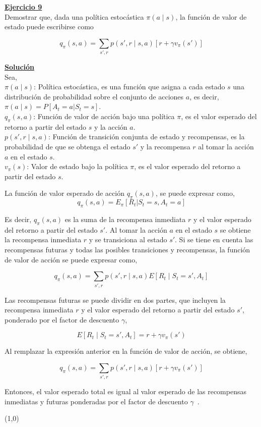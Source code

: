 \indent\underline{\textbf{Ejercicio 9}}\\
Demostrar que, dada una política estocástica $\pi (a \mid s)$, la función de valor de estado puede escribirse como

\[
    q_{\pi}(s,a) = \sum_{s',r} p(s', r \mid s, a) [r + \gamma v_{\pi}(s')]
\]

\indent\underline{\textbf{Solución}}\\
Sea,\\
$\pi(a \mid s)$: Política estocástica, es una función que asigna a cada estado $s$ una distribución de probabilidad sobre el conjunto de acciones $a$, es decir, $\pi(a \mid s) = P[A_t = a | S_t = s]$.\\
$q_{\pi}(s, a)$: Función de valor de acción bajo una política $\pi$, es el valor esperado del retorno a partir del estado $s$ y la acción $a$.\\
$p(s', r \mid s, a)$: Función de transición conjunta de estado y recompensas, es la probabilidad de que se obtenga el estado $s'$ y la recompensa $r$ al tomar la acción $a$ en el estado $s$.\\
$v_{\pi}(s)$: Valor de estado bajo la política $\pi$, es el valor esperado del retorno a partir del estado $s$.

La función de valor esperado de acción $q_{\pi}(s, a)$, se puede expresar como,
\[
    q_{\pi} (s,a) = E_{\pi}[R_t | S_t = s, A_t = a]
\]

Es decir, $q_{\pi}(s, a)$ es la suma de la recompensa inmediata $r$ y el valor esperado del retorno a partir del estado $s'$.
Al tomar la acción $a$ en el estado $s$ se obtiene la recompensa inmediata $r$ y se transiciona al estado $s'$.
Si se tiene en cuenta las recompensas futuras y todas las posibles transiciones y recompensas, la función de valor de acción se puede expresar como,

\[
    q_{\pi}(s,a) = \sum_{s',r} p(s', r \mid s, a) E[R_t \mid S_t = s', A_t]
\]

Las recompensas futuras se puede dividir en dos partes, que incluyen la recompensa inmediata $r$ y el valor esperado del retorno a partir del estado $s'$, ponderado por el factor de descuento $\gamma$,

\[
    E[R_t \mid S_t = s', A_t] = r + \gamma v_{\pi}(s')
\]

Al remplazar la expresión anterior en la función de valor de acción, se obtiene,

\[
    q_{\pi}(s,a) = \sum_{s',r} p(s', r \mid s, a) [r + \gamma v_{\pi}(s')]
\]

Entonces, el valor esperado total es igual al valor esperado de las recompensas inmediatas y futuras ponderadas por el factor de descuento $\gamma$~\cite{Sutton2018}.

\line(1,0){\textwidth}
